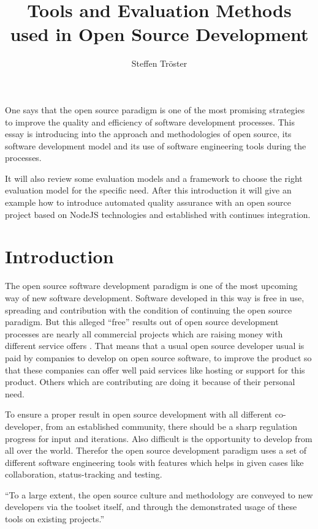 \documentclass[DIV=calc,paper=a4,fontsize=9pt,twocolumn]{scrartcl}
\title{Tools and Evaluation Methods used in Open Source Development}
\author{Steffen Tröster \\}
\date{}
\newcommand{\initial}[1]{
     \lettrine[lines=2,lhang=0.3,nindent=0em]{
                    \color{headblue}
                    {\textsf{#1}}}{}}
\begin{document}
\maketitle
\thispagestyle{fancy}		

\initial{O}ne says that the open source paradigm is one of the most promising strategies to improve the quality and efficiency of software development processes. This essay is introducing into the approach and methodologies of open source, its software development model and its use of software engineering tools during the processes.

It will also review some evaluation models and a framework to choose the right evaluation model for the specific need. After this introduction it will give an example how to introduce automated quality assurance with an open source project based on NodeJS technologies and established with continues integration. 

\section{Introduction}

The open source software development paradigm is one of the most upcoming way of new software development. Software developed in this way is free in use, spreading and contribution with the condition of continuing the open source paradigm. But this alleged \enquote{free} results out of open source development processes are nearly all commercial projects which are raising money with different service offers \citep{Wheeler}. That means that a usual open source developer usual is paid by companies to develop on open source software, to improve the product so that these companies can offer well paid services like hosting or support for this product. Others which are contributing are doing it because of their personal need.

To ensure a proper result in open source development with all different co-developer, from an established community, there should be a sharp regulation progress for input and iterations. Also difficult is the opportunity to develop from all over the world. Therefor the open source development paradigm uses a set of different software engineering tools with features which helps in given cases like collaboration, status-tracking and testing.

\enquote{To a large extent, the open source culture and methodology are conveyed to new developers via the toolset itself, and through the demonstrated usage of these tools on existing projects.} \citep{Robbins02adoptingoss}
\end{document}
